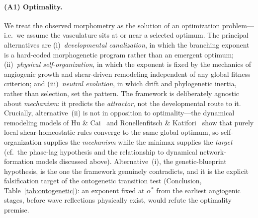 \paragraph{(A1) Optimality.}
We treat the observed morphometry as the solution of an optimization
problem---i.e.\ we assume the vasculature sits at or near a selected optimum.
The principal alternatives are (i)~\emph{developmental canalization}, in which
the branching exponent is a hard-coded morphogenetic program rather than an
emergent optimum; (ii)~\emph{physical self-organization}, in which the exponent
is fixed by the mechanics of angiogenic growth and shear-driven remodeling
independent of any global fitness criterion; and (iii)~\emph{neutral evolution},
in which drift and phylogenetic inertia, rather than selection, set the pattern.
The framework is deliberately agnostic about \emph{mechanism}: it predicts the
\emph{attractor}, not the developmental route to it. Crucially, alternative~(ii)
is not in opposition to optimality---the dynamical remodeling models of Hu \&
Cai~\cite{hucai2013} and Ronellenfitsch \& Katifori~\cite{ronellenfitsch2016}
show that purely local shear-homeostatic rules converge to the same global
optimum, so self-organization supplies the \emph{mechanism} while the minimax
supplies the \emph{target} (cf.\ the phase-lag hypothesis and the relationship
to dynamical network-formation models discussed above). Alternative~(i), the
genetic-blueprint hypothesis, is the one the framework genuinely contradicts,
and it is the explicit falsification target of the ontogenetic transition test
(Conclusion, Table~\ref{tab:ontogenetic}): an exponent fixed at $\alpha^*$ from
the earliest angiogenic stages, before wave reflections physically exist, would
refute the optimality premise.

